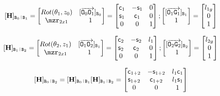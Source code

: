 \begin{itemize}
\begin{itemize}
	$$ \nmat{\vH}_{\ttB_0 \rl \ttB_1}  =
	\begin{bmatrix}
	 Rot(\theta_1, z_0) & \nmat{\overrightarrow{\ttO_0 \ttO_1}}_{\ttB_0} \\
	 \mzr_{2x1} & 1 \\
	\end{bmatrix}
	=
	\begin{bmatrix}
	 \ccos_1 & -\ssin_1 & 0 \\
	 \ssin_1 & \ccos_1 & 0 \\
	 0 & 0 & 1 \\
	\end{bmatrix} ;
	\begin{bmatrix}
	\nmat{\overrightarrow{\ttO_1 \ttG_1}}_{\ttB_1} \\
	1
	\end{bmatrix}
	=
	\begin{bmatrix}
	l_{1g} \\
	0 \\
	1 \\
	\end{bmatrix}
	$$

	$$ \nmat{\vH}_{\ttB_1 \rl \ttB_2} =
	\begin{bmatrix}
	 Rot(\theta_2, z_1) & \nmat{\overrightarrow{\ttO_1 \ttO_2}}_{\ttB_1} \\
	 \mzr_{2x1} & 1 \\
	\end{bmatrix}
	=
	\begin{bmatrix}
	 \ccos_2 & -\ssin_2 & l_1 \\
	 \ssin_2 & \ccos_2 & 0 \\
	 0 & 0 & 1 \\
	\end{bmatrix} ;
	\begin{bmatrix}
	 \nmat{\overrightarrow{\ttO_2 \ttG_2}}_{\ttB_2} \\
	1
	\end{bmatrix}
	=
	\begin{bmatrix}
	l_{2g} \\
	0 \\
	1 \\
	\end{bmatrix}
	$$

	$$
	\nmat{\vH}_{\ttB_0 \rl \ttB_2} = \nmat{\vH}_{\ttB_0 \rl \ttB_1} \nmat{\vH}_{\ttB_1 \rl \ttB_2}  =
	\begin{bmatrix}
	\ccos_{1+2} & -\ssin_{1+2} & l_1 \ccos_1 \\
	\ssin_{1+2} & \ccos_{1+2} & l_1 \ssin_1 \\
	0 & 0 & 1 \\
	\end{bmatrix}
	$$



\end{itemize}
\end{itemize}
